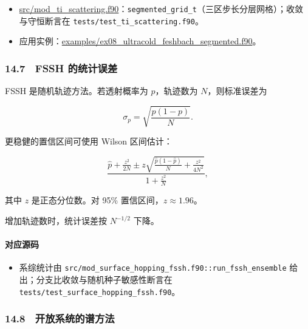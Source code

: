 \documentclass[
]{ctexbook}
\providecommand{\tightlist}{%
  \setlength{\itemsep}{0pt}\setlength{\parskip}{0pt}}
\begin{document}
\begin{itemize}
\tightlist
\item
  \href{https://github.com/l1Ha/QuantumGeneralModule/blob/main/src/mod_ti_scattering.f90}{src/mod\_ti\_scattering.f90}：\texttt{segmented\_grid\_t}（三区步长分层网格）；收敛与守恒断言在
  \texttt{tests/test\_ti\_scattering.f90}。
\item
  应用实例：\href{https://github.com/l1Ha/QuantumGeneralModule/blob/main/examples/ex08_ultracold_feshbach_segmented.f90}{examples/ex08\_ultracold\_feshbach\_segmented.f90}。
\end{itemize}

\hypertarget{fssh-ux7684ux7edfux8ba1ux8befux5dee}{%
\subsubsection{14.7　FSSH
的统计误差}\label{fssh-ux7684ux7edfux8ba1ux8befux5dee}}

FSSH 是随机轨迹方法。若透射概率为 \(p\)，轨迹数为 \(N\)，则标准误差为

\[
\sigma_p
=
\sqrt{\frac{p(1-p)}{N}}.
\]

更稳健的置信区间可使用 Wilson 区间估计：

\[
\frac{
\hat p+\frac{z^2}{2N}
\pm
z\sqrt{
\frac{\hat p(1-\hat p)}{N}
+
\frac{z^2}{4N^2}
}
}
{
1+\frac{z^2}{N}
},
\]

其中 \(z\) 是正态分位数。对 95\% 置信区间，\(z\approx1.96\)。

增加轨迹数时，统计误差按 \(N^{-1/2}\) 下降。

\hypertarget{ux5bf9ux5e94ux6e90ux7801-63}{%
\paragraph{对应源码}\label{ux5bf9ux5e94ux6e90ux7801-63}}

\begin{itemize}
\tightlist
\item
  系综统计由
  \texttt{src/mod\_surface\_hopping\_fssh.f90::run\_fssh\_ensemble}
  给出；分支比收敛与随机种子敏感性断言在
  \texttt{tests/test\_surface\_hopping\_fssh.f90}。
\end{itemize}

\hypertarget{ux5f00ux653eux7cfbux7edfux7684ux8c31ux65b9ux6cd5}{%
\subsubsection{14.8　开放系统的谱方法}\label{ux5f00ux653eux7cfbux7edfux7684ux8c31ux65b9ux6cd5}}
\end{document}
